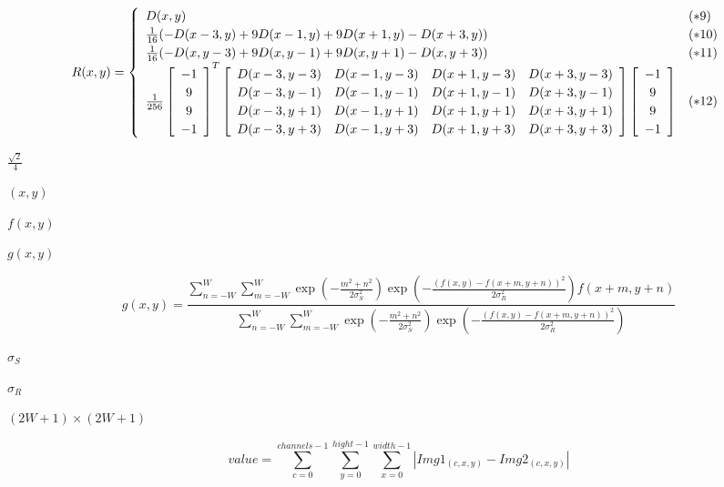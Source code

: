 \documentclass{article}
\begin{document}
\[ {\renewcommand\arraystretch{1.2} R(x,y) = \left\{\begin{array}{ll} D(x,y) & (*9) \\ \frac{1}{16}(-D(x-3,y)+9D(x-1,y)+9D(x+1,y)-D(x+3,y)) & (*10) \\ \frac{1}{16}(-D(x,y-3)+9D(x,y-1)+9D(x,y+1)-D(x,y+3)) & (*11) \\ \frac{1}{256}\left[\begin{array}{c} -1 \\ 9 \\ 9 \\ -1 \end{array}\right]^T \left[\begin{array}{cccc} D(x-3,y-3) & D(x-1,y-3) & D(x+1,y-3) & D(x+3,y-3) \\ D(x-3,y-1) & D(x-1,y-1) & D(x+1,y-1) & D(x+3,y-1) \\ D(x-3,y+1) & D(x-1,y+1) & D(x+1,y+1) & D(x+3,y+1) \\ D(x-3,y+3) & D(x-1,y+3) & D(x+1,y+3) & D(x+3,y+3) \end{array}\right] \left[\begin{array}{c} -1 \\ 9 \\ 9 \\ -1 \end{array}\right] & (*12) \\ \end{array}\right. } \]
\pagebreak

$\frac{\sqrt{2}}{4}$
\pagebreak

$(x,y)$
\pagebreak

$f(x,y)$
\pagebreak

$g(x,y)$
\pagebreak

\[ g(x,y) = \frac{ \displaystyle \sum^W_{n=-W}\sum^W_{m=-W} \exp\left( -\frac{m^{2}+n^{2}}{2\sigma_{S}^{2}} \right) \exp\left( -\frac{(f(x,y)-f(x+m,y+n))^{2}}{2\sigma_{R}^{2}} \right) f(x+m,y+n) }{ \displaystyle \sum^W_{n=-W}\sum^W_{m=-W} \exp\left( -\frac{m^{2}+n^{2}}{2\sigma_{S}^{2}} \right) \exp\left( -\frac{(f(x,y)-f(x+m,y+n))^{2}}{2\sigma_{R}^{2}} \right) } \]
\pagebreak

$\sigma_{S}$
\pagebreak

$\sigma_{R}$
\pagebreak

$\left(2W+1\right) \times \left(2W+1\right)$
\pagebreak

\[ value = \sum_{c=0}^{channels-1}\sum_{y=0}^{hight-1}\sum_{x=0}^{width-1}| Img1_{(c,x,y)} - Img2_{(c,x,y)} | \]
\pagebreak
\end{document}

